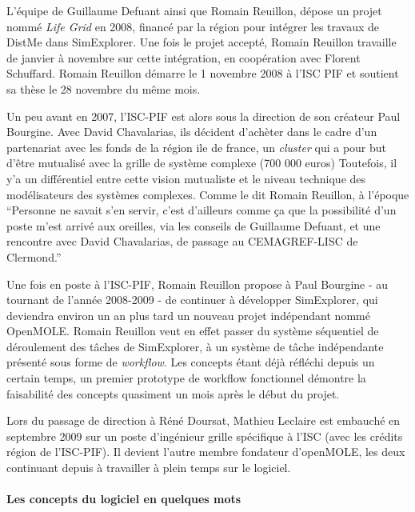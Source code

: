 L'équipe de Guillaume Defuant ainsi que Romain Reuillon, dépose un projet nommé \textit{Life Grid} en 2008, financé par la région pour intégrer les travaux de DistMe dans SimExplorer. Une fois le projet accepté, Romain Reuillon travaille de janvier à novembre sur cette intégration, en coopération avec Florent Schuffard. Romain Reuillon démarre le 1 novembre 2008 à l'ISC PIF et soutient sa thèse le 28 novembre du même mois.

Un peu avant en 2007, l'ISC-PIF est alors sous la direction de son créateur Paul Bourgine. Avec David Chavalarias, ils décident d'achèter dans le cadre d'un partenariat avec les fonds de la région ile de france, un \textit{cluster} qui a pour but d'être mutualisé avec la grille de système complexe (700 000 euros) Toutefois, il y'a un différentiel entre cette vision mutualiste et le niveau technique des modélisateurs des systèmes complexes. Comme le dit Romain Reuillon, à l'époque \enquote{Personne ne savait s'en servir, c'est d'ailleurs comme ça que la possibilité d'un poste m'est arrivé aux oreilles, via les conseils de Guillaume Defuant, et une rencontre avec David Chavalarias, de passage au CEMAGREF-LISC de Clermond.}

Une fois en poste à l'ISC-PIF, Romain Reuillon propose à Paul Bourgine - au tournant de l'année 2008-2009 - de continuer à développer SimExplorer, qui deviendra environ un an plus tard un nouveau projet indépendant nommé OpenMOLE. Romain Reuillon veut en effet passer du système séquentiel de déroulement des tâches de SimExplorer, à un système de tâche indépendante présenté sous forme de \textit{workflow}. Les concepts étant déjà réfléchi depuis un certain temps, un premier prototype de workflow fonctionnel démontre la faisabilité des concepts quasiment un mois après le début du projet.

Lors du passage de direction à Réné Doursat, Mathieu Leclaire est embauché en septembre 2009 sur un poste d'ingénieur grille spécifique à l'ISC (avec les crédits région de l'ISC-PIF). Il devient l'autre membre fondateur d'openMOLE, les deux continuant depuis à travailler à plein temps sur le logiciel.

\paragraph {Les concepts du logiciel en quelques mots}

